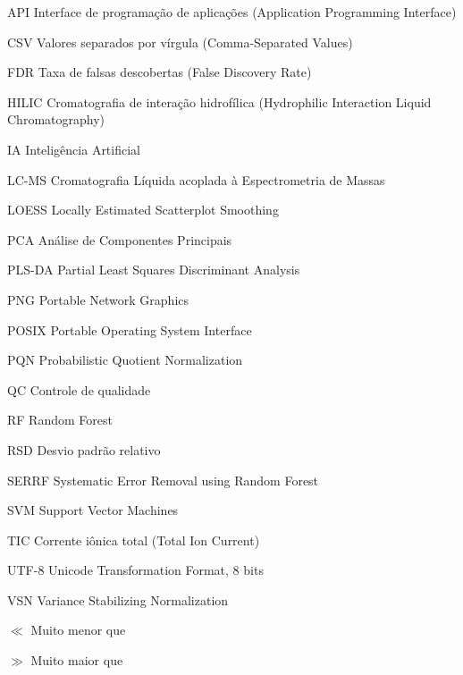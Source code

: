 \documentclass[
	12pt,					%
	openright,				%
	oneside,					%
	a4paper,					%
	english,					%
	portuguese					%
	]{abntex2}
\begin{document}
\begin{siglas}
  \item[API] Interface de programação de aplicações (Application Programming Interface)
  \item[CSV] Valores separados por vírgula (Comma-Separated Values)
  \item[FDR] Taxa de falsas descobertas (False Discovery Rate)
  \item[HILIC] Cromatografia de interação hidrofílica (Hydrophilic Interaction Liquid Chromatography)
  \item[IA] Inteligência Artificial
  \item[LC-MS] Cromatografia Líquida acoplada à Espectrometria de Massas
  \item[LOESS] Locally Estimated Scatterplot Smoothing
  \item[PCA] Análise de Componentes Principais
  \item[PLS-DA] Partial Least Squares Discriminant Analysis
  \item[PNG] Portable Network Graphics
  \item[POSIX] Portable Operating System Interface
  \item[PQN] Probabilistic Quotient Normalization
  \item[QC] Controle de qualidade
  \item[RF] Random Forest
  \item[RSD] Desvio padrão relativo
  \item[SERRF] Systematic Error Removal using Random Forest
  \item[SVM] Support Vector Machines
  \item[TIC] Corrente iônica total (Total Ion Current)
  \item[UTF-8] Unicode Transformation Format, 8 bits
  \item[VSN] Variance Stabilizing Normalization
\end{siglas}

\begin{simbolos}
\item[$\ll$] Muito menor que
\item[$\gg$] Muito maior que
\end{simbolos}

\tableofcontents*
\cleardoublepage


\textual %
\end{document}
